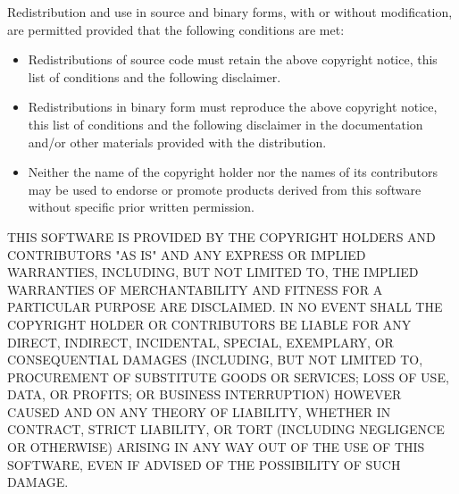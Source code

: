 
{\footnotesize
Redistribution and use in source and binary forms, with or without modification, are permitted provided that the following conditions are met:

\begin{itemize}
\item
Redistributions of source code must retain the above copyright notice, this list of conditions and the following disclaimer.
\item
Redistributions in binary form must reproduce the above copyright notice, this list of conditions and the following disclaimer in the documentation and/or other materials provided with the distribution.
\item
Neither the name of the copyright holder nor the names of its contributors may be used to endorse or promote products derived from this software without specific prior written permission.
\end{itemize}

THIS SOFTWARE IS PROVIDED BY THE COPYRIGHT HOLDERS AND CONTRIBUTORS "AS IS" AND ANY EXPRESS OR IMPLIED WARRANTIES, INCLUDING, BUT NOT LIMITED TO, THE IMPLIED WARRANTIES OF MERCHANTABILITY AND FITNESS FOR A PARTICULAR PURPOSE ARE DISCLAIMED. IN NO EVENT SHALL THE COPYRIGHT HOLDER OR CONTRIBUTORS BE LIABLE FOR ANY DIRECT, INDIRECT, INCIDENTAL, SPECIAL, EXEMPLARY, OR CONSEQUENTIAL DAMAGES (INCLUDING, BUT NOT LIMITED TO, PROCUREMENT OF SUBSTITUTE GOODS OR SERVICES; LOSS OF USE, DATA, OR PROFITS; OR BUSINESS INTERRUPTION) HOWEVER CAUSED AND ON ANY THEORY OF LIABILITY, WHETHER IN CONTRACT, STRICT LIABILITY, OR TORT (INCLUDING NEGLIGENCE OR OTHERWISE) ARISING IN ANY WAY OUT OF THE USE OF THIS SOFTWARE, EVEN IF ADVISED OF THE POSSIBILITY OF SUCH DAMAGE.
}

